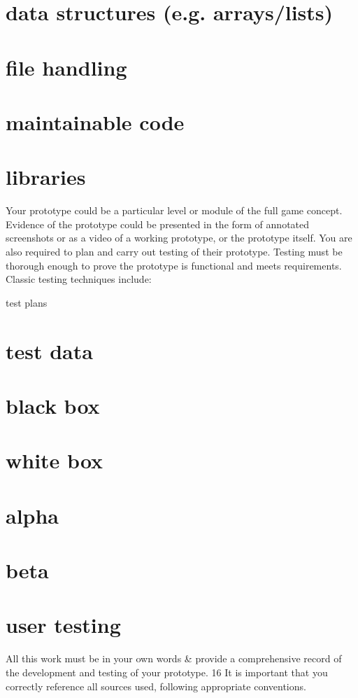 \section{data structures (e.g. arrays/lists)}
\section{file handling}
\section{maintainable code}
\section{libraries}

Your prototype could be a particular level or module of the full game concept. Evidence of the
prototype could be presented in the form of annotated screenshots or as a video of a working
prototype, or the prototype itself.
You are also required to plan and carry out testing of their prototype. Testing must be thorough
enough to prove the prototype is functional and meets requirements. Classic testing techniques
include:

test plans
\section{test data}
\section{black box}
\section{white box}
\section{alpha}
\section{beta}
\section{user testing}
All this work must be in your own words \& provide a comprehensive record of the development
and testing of your prototype.
16
It is important that you correctly reference all sources used, following appropriate conventions.


